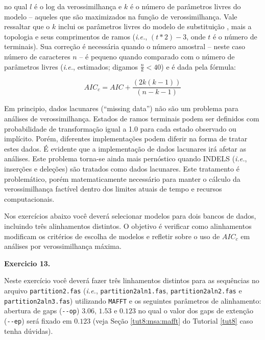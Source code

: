 \begin{refsection}
no qual $l$ é o log da verossimilhança e $k$ é o número de parâmetros livres do modelo -- aqueles que são maximizados na função de verossimilhança. Vale ressaltar que o $k$ inclui os parâmetros livres do modelo de substituição \parencite[veja Tabela 1 de][]{Darriba_and_Posada_2015}, mais a topologia e seus comprimentos de ramos (\textit{i.e.}, $(t * 2)-3$, onde $t$ é o número de terminais). Sua correção é necessária quando o número amostral -- neste caso número de caracteres $n$ -- é pequeno quando comparado com o número de parâmetros livres (\textit{i.e.}, estimados; digamos $\frac{n}{k} < 40$) e é dada pela fórmula:

\begin{center}
\begin{equation}\label{tut12:first_sec:model_aicc}
AIC_{c} = AIC + \frac{(2k(k-1))}{(n-k-1)}
\end{equation}
\end{center}

Em principio, dados lacunares (``missing data'') não são um problema para análises de verossimilhança. Estados de ramos terminais podem ser definidos com probabilidade de transformação igual a 1.0 para cada estado observado ou implícito. Porém, diferentes implementações podem diferir na forma de tratar estes dados. É evidente que a implementação de dados lacunares irá afetar as análises. Este problema torna-se ainda mais pernóstico quando INDELS (\textit{i.e.}, inserções e deleções) são tratados como dados lacunares. Este tratamento é problemático, porém matematicamente necessário para manter o cálculo da verossimilhança factível dentro dos limites atuais de tempo e recursos computacionais.

Nos exercícios abaixo você deverá selecionar modelos para dois bancos de dados, incluindo três alinhamentos distintos. O objetivo é verificar como alinhamentos modificam os critérios de escolha de modelos e refletir sobre o uso de $AIC_{c}$ em análises por verossimilhança máxima.\\


\begin{blackBlock}{\textbf{Exercicio 13.}}\label{tut12:ex:13.5}

Neste exercício você deverá fazer três linhamentos distintos para as sequências no arquivo \texttt{partition2.fas} (\textit{i.e.}, \texttt{partition2aln1.fas}, \texttt{partition2aln2.fas} e \texttt{partition2aln3.fas}) utilizando \texttt{MAFFT} e os seguintes parâmetros de alinhamento: abertura de gaps (\texttt{{-}{-}op})  $3.06$, $1.53$ e $0.123$ no qual o valor dos gaps de extenção (\texttt{{-}{-}ep})  será fixado em $0.123$ (veja Seção \ref{tut8:msa:mafft} do Tutorial \ref{tut8} caso tenha dúvidas).


\end{blackBlock}
\end{refsection}

